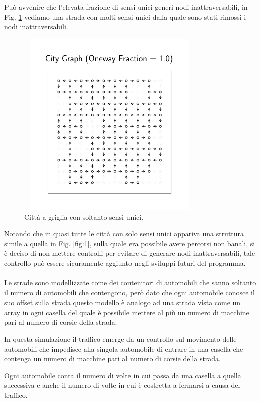 \documentclass[main.tex]{subfiles}
\begin{document}
Può avvenire che l'elevata frazione di sensi unici generi nodi inattraversabili, in Fig. \ref{fig:2} vediamo una strada con molti sensi unici dalla
quale sono stati rimossi i nodi inattraversabili.

\begin{figure}[H]
    \centering
    \includegraphics[width=9cm, height=9cm]{city30.png}
    \caption{Città a griglia con soltanto sensi unici.}
    \label{fig:2}
\end{figure}

Notando che in quasi tutte le città con solo sensi unici appariva una struttura simile a quella in Fig. \ref{fig:1}, sulla quale era possibile avere 
percorsi non banali, si è deciso di non mettere controlli per evitare di generare nodi inattraversabili, tale controllo può essere sicuramente aggiunto
negli sviluppi futuri del programma.\\
\hfill \\
Le strade sono modellizzate come dei contenitori di automobili che sanno soltanto il numero di automobili che contengono, però dato che ogni automobile conosce il suo offset sulla strada
questo modello è analogo ad una strada vista come un array in ogni casella del quale è possibile mettere al più un numero di macchine pari al numero di corsie della strada.

In questa simulazione il traffico emerge da un controllo sul movimento delle automobili che impedisce
alla singola automobile di entrare in una casella che contenga un numero di macchine pari al numero di corsie della strada.

Ogni automobile conta il numero di volte in cui passa da una casella a quella successiva e anche il numero di volte in cui
è costretta a fermarsi a causa del traffico.
\end{document}
